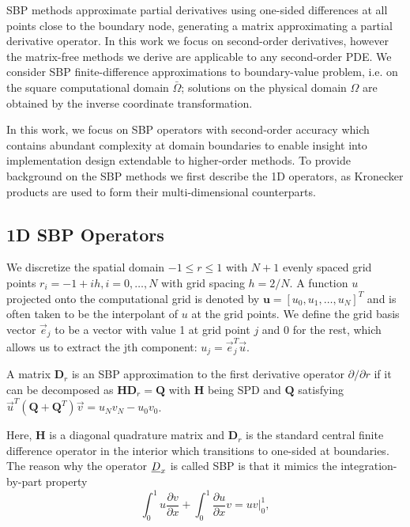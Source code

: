 SBP methods approximate partial derivatives using one-sided differences at all points close to the boundary node, generating a matrix approximating a partial derivative operator. In this work we focus on second-order derivatives, however the matrix-free methods we derive are applicable to any second-order PDE. We consider SBP finite-difference approximations to boundary-value problem, i.e. on the square computational domain $\bar\Omega$; solutions on the physical domain $\Omega$ are obtained by the inverse coordinate transformation.

In this work, we focus on SBP operators with second-order accuracy which contains abundant complexity at domain boundaries to enable insight into implementation design extendable to higher-order methods.  To provide background on the SBP methods we first describe the 1D operators, as Kronecker products are used to form their multi-dimensional counterparts. 


\subsection{1D SBP Operators}

We discretize the spatial domain $-1\leq r \leq 1$ with $N+1$ evenly spaced grid points $r_i = -1 + ih, i=0, \dots, N$ with grid spacing $h = 2/N$. A function $u$ projected onto the computational grid is denoted by $\boldsymbol{u} = [u_0, u_1, \dots, u_N]^T$ and is often taken to be the interpolant of $u$ at the grid points. We define the grid basis vector $\vec{e}_j$ to be a vector with value 1 at grid point $j$ and 0 for the rest, which allows us to extract the jth component: $u_j = \vec{e}_j^T\vec{u}$.  

\begin{definition}
  A matrix $\boldsymbol{D}_{r}$ is an SBP approximation to the first derivative operator $\partial /\partial
  r$ if it can be decomposed as $\boldsymbol{H}\boldsymbol{D}_{r} = \boldsymbol{Q}$ with $\boldsymbol{H}$ being SPD and $\boldsymbol{Q}$ satisfying $\vec{u}^{T}(\boldsymbol{Q} +
  \boldsymbol{Q}^{T})\vec{v} = u_{N}v_{N} - u_{0}v_{0}$.
\end{definition}
%
\noindent Here, $\boldsymbol{H}$ is a diagonal quadrature matrix and  $\boldsymbol{D}_{r}$ is the standard central finite difference operator in the interior which transitions to one-sided at boundaries.
The reason why the operator $\emph{D}_x$ is called SBP is that it mimics the integration-by-part property 
\begin{equation}
  \int_0^1 u \frac{\partial v}{\partial x} + \int_0^1 \frac{\partial u}{\partial x} v = uv\bigg|_0^1,
  \label{eqn:1d_ibp}
\end{equation}

